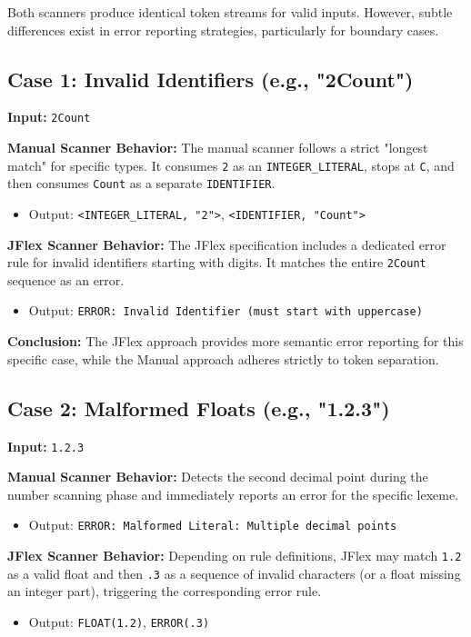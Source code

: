 \documentclass[12pt]{article}
\begin{document}
Both scanners produce identical token streams for valid inputs. However, subtle differences exist in error reporting strategies, particularly for boundary cases.

\subsection{Case 1: Invalid Identifiers (e.g., "2Count")}
\textbf{Input:} \texttt{2Count}

\textbf{Manual Scanner Behavior:}
The manual scanner follows a strict "longest match" for specific types. It consumes \texttt{2} as an \texttt{INTEGER\_LITERAL}, stops at \texttt{C}, and then consumes \texttt{Count} as a separate \texttt{IDENTIFIER}.
\begin{itemize}
    \item Output: \texttt{<INTEGER\_LITERAL, "2">}, \texttt{<IDENTIFIER, "Count">}
\end{itemize}

\textbf{JFlex Scanner Behavior:}
The JFlex specification includes a dedicated error rule for invalid identifiers starting with digits. It matches the entire \texttt{2Count} sequence as an error.
\begin{itemize}
    \item Output: \texttt{ERROR: Invalid Identifier (must start with uppercase)}
\end{itemize}

\textbf{Conclusion:} The JFlex approach provides more semantic error reporting for this specific case, while the Manual approach adheres strictly to token separation.

\subsection{Case 2: Malformed Floats (e.g., "1.2.3")}
\textbf{Input:} \texttt{1.2.3}

\textbf{Manual Scanner Behavior:}
Detects the second decimal point during the number scanning phase and immediately reports an error for the specific lexeme.
\begin{itemize}
    \item Output: \texttt{ERROR: Malformed Literal: Multiple decimal points}
\end{itemize}

\textbf{JFlex Scanner Behavior:}
Depending on rule definitions, JFlex may match \texttt{1.2} as a valid float and then \texttt{.3} as a sequence of invalid characters (or a float missing an integer part), triggering the corresponding error rule.
\begin{itemize}
    \item Output: \texttt{FLOAT(1.2)}, \texttt{ERROR(.3)}
\end{itemize}
\end{document}
